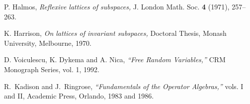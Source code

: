 \documentclass{pnastwo}
\begin{document}
\begin{article}
\begin{thebibliography}{21}
  P. Halmos, {\em Reflexive lattices of subspaces,}
J. London Math. Soc. {\bf 4}  (1971),  257--263.

 K. Harrison, {\em On lattices of invariant
subspaces,} Doctoral Thesis, Monash University, Melbourne, 1970.


 D. Voiculescu, K. Dykema and A. Nica, {\em ``Free
Random Variables,''} CRM Monograph Series, vol. 1, 1992.

 R.\ Kadison and J.\ Ringrose, {\em ``Fundamentals of
the Operator Algebras,''} vols. I and II, Academic Press, Orlando,
1983 and 1986.

\end{thebibliography}

\end{article}







\end{document}

